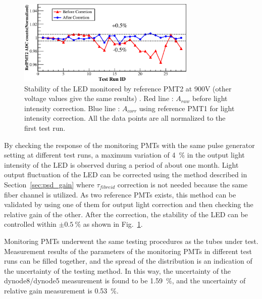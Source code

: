 \documentclass{nst}
\begin{document}
\begin{figure}[!htb]
	\centering
	\includegraphics[width=85mm]{FIG10}
	\caption{Stability of the LED monitored by reference PMT2 at 900V (other voltage values give the same results) . Red line : $A_{raw}$ before light intensity correction. Blue line : $A_{corr}$ using reference PMT1 for light intensity correction. All the data points are all normalized to the first test run.}
	\label{fig:FIG10}
\end{figure} 

By checking the response of the monitoring PMTs with the same pulse generator setting at different test runs, a maximum variation of \SI{4}{\percent} in the output light intensity of the LED is observed during a period of about one month.
Light output fluctuation of the LED can be corrected using the method described in Section~\ref{sec:psd_gain} where $\tau_{fibreid}$ correction is not needed because the same fiber channel is utilized.
As two reference PMTs exists, this method can be validated by using one of them for output light correction and then checking the relative gain of the other. 
After the correction, the stability of the LED can be controlled within $\pm\SI{0.5}{\percent}$ as shown in Fig.~\ref{fig:FIG10}.

Monitoring PMTs underwent the same testing procedures as the tubes under test.
Measurement results of the parameters of the monitoring PMTs in different test runs can be filled together, and the spread of the distribution is an indication of the uncertainty of the testing method.
In this way, the uncertainty of the dynode8/dynode5 measurement is found to be \SI{1.59}{\percent}, and the uncertainty of relative gain measurement is \SI{0.53}{\percent}. 
\end{document}
